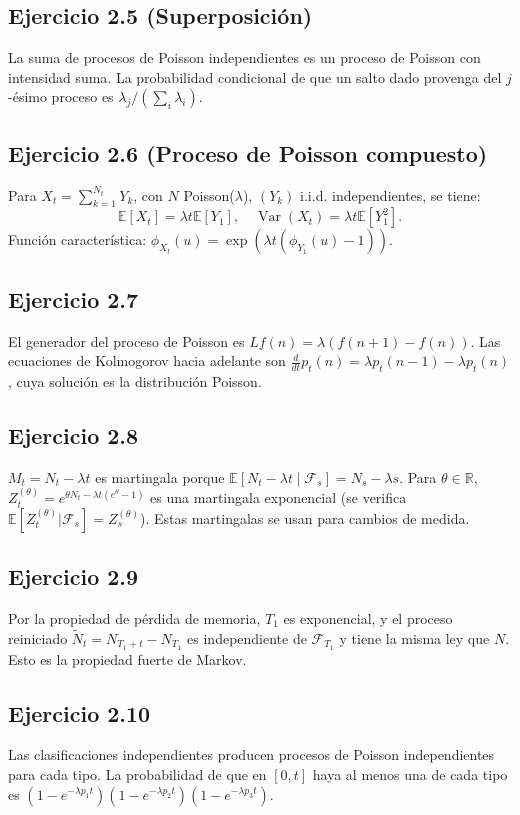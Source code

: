 \documentclass[12pt]{article}
\newcommand{\E}{\mathbb{E}}
\newcommand{\R}{\mathbb{R}}
\newcommand{\1}{\mathbf{1}}
\newcommand{\F}{\mathcal{F}}
\newcommand{\Var}{\operatorname{Var}}
\begin{document}
\subsection{Ejercicio 2.5 (Superposici\'on)}
La suma de procesos de Poisson independientes es un proceso de Poisson con intensidad suma. La probabilidad condicional de que un salto dado provenga del $j$-\'esimo proceso es $\lambda_j/(\sum_i\lambda_i)$.

\subsection{Ejercicio 2.6 (Proceso de Poisson compuesto)}
Para $X_t=\sum_{k=1}^{N_t}Y_k$, con $N$ Poisson($\lambda$), $(Y_k)$ i.i.d. independientes, se tiene:
\[
\E[X_t]=\lambda t\E[Y_1],\quad \Var(X_t)=\lambda t\E[Y_1^2].
\]
Funci\'on caracter\'istica: $\phi_{X_t}(u)=\exp(\lambda t(\phi_{Y_1}(u)-1))$.

\subsection{Ejercicio 2.7}
El generador del proceso de Poisson es $Lf(n)=\lambda(f(n+1)-f(n))$. Las ecuaciones de Kolmogorov hacia adelante son $\frac{d}{dt}p_t(n)=\lambda p_t(n-1)-\lambda p_t(n)$, cuya soluci\'on es la distribuci\'on Poisson.

\subsection{Ejercicio 2.8}
$M_t=N_t-\lambda t$ es martingala porque $\E[N_t-\lambda t\mid\F_s]=N_s-\lambda s$. Para $\theta\in\R$, $Z_t^{(\theta)}=e^{\theta N_t-\lambda t(e^\theta-1)}$ es una martingala exponencial (se verifica $\E[Z_t^{(\theta)}|\F_s]=Z_s^{(\theta)}$). Estas martingalas se usan para cambios de medida.

\subsection{Ejercicio 2.9}
Por la propiedad de p\'erdida de memoria, $T_1$ es exponencial, y el proceso reiniciado $\tilde{N}_t=N_{T_1+t}-N_{T_1}$ es independiente de $\F_{T_1}$ y tiene la misma ley que $N$. Esto es la propiedad fuerte de Markov.

\subsection{Ejercicio 2.10}
Las clasificaciones independientes producen procesos de Poisson independientes para cada tipo. La probabilidad de que en $[0,t]$ haya al menos una de cada tipo es $(1-e^{-\lambda p_1t})(1-e^{-\lambda p_2t})(1-e^{-\lambda p_3t})$.
\end{document}
